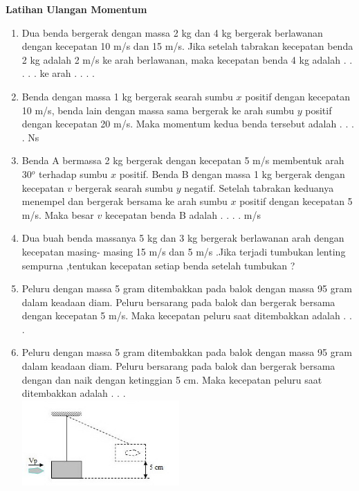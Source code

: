 \documentclass[10pt,a4paper]{extarticle}
\begin{document}
 \textbf{Latihan Ulangan Momentum} \phantom{ini nama siswa yang aaamengerjakan soal kuis ini }  

\begin{multicols*}{2}

\begin{enumerate}
\item Dua benda bergerak dengan massa 2 kg dan 4 kg bergerak berlawanan dengan kecepatan 10 m/s dan 15 m/s. Jika setelah tabrakan kecepatan benda 2 kg adalah 2 m/s ke arah berlawanan, maka kecepatan benda 4 kg adalah . . . . . ke arah . . . .
\vspace{3cm}

\item Benda dengan massa 1 kg bergerak searah sumbu $x$ positif dengan kecepatan 10 m/s, benda lain dengan massa sama bergerak ke arah sumbu $y$ positif dengan kecepatan 20 m/s. Maka momentum kedua benda tersebut adalah . .  . .  Ns
\vspace{3.5cm}


\item Benda A bermassa 2 kg bergerak dengan kecepatan 5 m/s membentuk arah 30$^o$ terhadap sumbu $x$ positif. Benda B dengan massa 1 kg bergerak dengan kecepatan $v$ bergerak searah sumbu $y$ negatif. Setelah tabrakan keduanya menempel dan bergerak bersama ke arah sumbu $x$ positif dengan kecepatan 5 m/s. Maka besar $v$ kecepatan benda B adalah . . . . m/s
\vspace{4cm}



\item Dua buah benda massanya 5 kg dan 3 kg bergerak berlawanan arah dengan kecepatan masing-   masing 15 m/s dan 5 m/s .Jika terjadi tumbukan lenting sempurna ,tentukan kecepatan setiap benda setelah tumbukan ?
\vspace{4.5cm}



\item Peluru dengan massa 5 gram ditembakkan pada balok dengan massa 95 gram dalam keadaan diam. Peluru bersarang pada balok dan bergerak bersama dengan kecepatan 5 m/s. Maka kecepatan peluru saat ditembakkan adalah . . .
\vspace{3cm}

\item Peluru dengan massa 5 gram ditembakkan pada balok dengan massa 95 gram dalam keadaan diam. Peluru bersarang pada balok dan bergerak bersama dengan dan naik dengan ketinggian 5 cm. Maka kecepatan peluru saat ditembakkan adalah . . .\\
\includegraphics[width=6cm]{pic/latul-mom1} 
\vspace{2cm}




\end{enumerate}
\end{multicols*}
\end{document}
